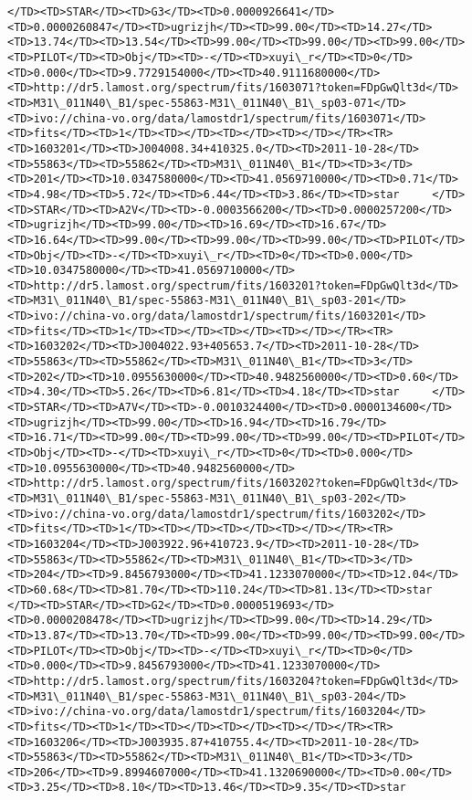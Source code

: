 \documentclass[11pt]{article}
\begin{document}
\begin{Verbatim}[commandchars=\\\{\}]
</TD><TD>STAR</TD><TD>G3</TD><TD>0.0000926641</TD><TD>0.0000260847</TD><TD>ugrizjh</TD><TD>99.00</TD><TD>14.27</TD><TD>13.74</TD><TD>13.54</TD><TD>99.00</TD><TD>99.00</TD><TD>99.00</TD><TD>PILOT</TD><TD>Obj</TD><TD>-</TD><TD>xuyi\_r</TD><TD>0</TD><TD>0.000</TD><TD>9.7729154000</TD><TD>40.9111680000</TD><TD>http://dr5.lamost.org/spectrum/fits/1603071?token=FDpGwQlt3d</TD><TD>M31\_011N40\_B1/spec-55863-M31\_011N40\_B1\_sp03-071</TD><TD>ivo://china-vo.org/data/lamostdr1/spectrum/fits/1603071</TD><TD>fits</TD><TD>1</TD><TD></TD><TD></TD><TD></TD></TR><TR><TD>1603201</TD><TD>J004008.34+410325.0</TD><TD>2011-10-28</TD><TD>55863</TD><TD>55862</TD><TD>M31\_011N40\_B1</TD><TD>3</TD><TD>201</TD><TD>10.0347580000</TD><TD>41.0569710000</TD><TD>0.71</TD><TD>4.98</TD><TD>5.72</TD><TD>6.44</TD><TD>3.86</TD><TD>star     </TD><TD>STAR</TD><TD>A2V</TD><TD>-0.0003566200</TD><TD>0.0000257200</TD><TD>ugrizjh</TD><TD>99.00</TD><TD>16.69</TD><TD>16.67</TD><TD>16.64</TD><TD>99.00</TD><TD>99.00</TD><TD>99.00</TD><TD>PILOT</TD><TD>Obj</TD><TD>-</TD><TD>xuyi\_r</TD><TD>0</TD><TD>0.000</TD><TD>10.0347580000</TD><TD>41.0569710000</TD><TD>http://dr5.lamost.org/spectrum/fits/1603201?token=FDpGwQlt3d</TD><TD>M31\_011N40\_B1/spec-55863-M31\_011N40\_B1\_sp03-201</TD><TD>ivo://china-vo.org/data/lamostdr1/spectrum/fits/1603201</TD><TD>fits</TD><TD>1</TD><TD></TD><TD></TD><TD></TD></TR><TR><TD>1603202</TD><TD>J004022.93+405653.7</TD><TD>2011-10-28</TD><TD>55863</TD><TD>55862</TD><TD>M31\_011N40\_B1</TD><TD>3</TD><TD>202</TD><TD>10.0955630000</TD><TD>40.9482560000</TD><TD>0.60</TD><TD>4.30</TD><TD>5.26</TD><TD>6.81</TD><TD>4.18</TD><TD>star     </TD><TD>STAR</TD><TD>A7V</TD><TD>-0.0010324400</TD><TD>0.0000134600</TD><TD>ugrizjh</TD><TD>99.00</TD><TD>16.94</TD><TD>16.79</TD><TD>16.71</TD><TD>99.00</TD><TD>99.00</TD><TD>99.00</TD><TD>PILOT</TD><TD>Obj</TD><TD>-</TD><TD>xuyi\_r</TD><TD>0</TD><TD>0.000</TD><TD>10.0955630000</TD><TD>40.9482560000</TD><TD>http://dr5.lamost.org/spectrum/fits/1603202?token=FDpGwQlt3d</TD><TD>M31\_011N40\_B1/spec-55863-M31\_011N40\_B1\_sp03-202</TD><TD>ivo://china-vo.org/data/lamostdr1/spectrum/fits/1603202</TD><TD>fits</TD><TD>1</TD><TD></TD><TD></TD><TD></TD></TR><TR><TD>1603204</TD><TD>J003922.96+410723.9</TD><TD>2011-10-28</TD><TD>55863</TD><TD>55862</TD><TD>M31\_011N40\_B1</TD><TD>3</TD><TD>204</TD><TD>9.8456793000</TD><TD>41.1233070000</TD><TD>12.04</TD><TD>60.68</TD><TD>81.70</TD><TD>110.24</TD><TD>81.13</TD><TD>star     </TD><TD>STAR</TD><TD>G2</TD><TD>0.0000519693</TD><TD>0.0000208478</TD><TD>ugrizjh</TD><TD>99.00</TD><TD>14.29</TD><TD>13.87</TD><TD>13.70</TD><TD>99.00</TD><TD>99.00</TD><TD>99.00</TD><TD>PILOT</TD><TD>Obj</TD><TD>-</TD><TD>xuyi\_r</TD><TD>0</TD><TD>0.000</TD><TD>9.8456793000</TD><TD>41.1233070000</TD><TD>http://dr5.lamost.org/spectrum/fits/1603204?token=FDpGwQlt3d</TD><TD>M31\_011N40\_B1/spec-55863-M31\_011N40\_B1\_sp03-204</TD><TD>ivo://china-vo.org/data/lamostdr1/spectrum/fits/1603204</TD><TD>fits</TD><TD>1</TD><TD></TD><TD></TD><TD></TD></TR><TR><TD>1603206</TD><TD>J003935.87+410755.4</TD><TD>2011-10-28</TD><TD>55863</TD><TD>55862</TD><TD>M31\_011N40\_B1</TD><TD>3</TD><TD>206</TD><TD>9.8994607000</TD><TD>41.1320690000</TD><TD>0.00</TD><TD>3.25</TD><TD>8.10</TD><TD>13.46</TD><TD>9.35</TD><TD>star     
\end{Verbatim}
\end{document}

